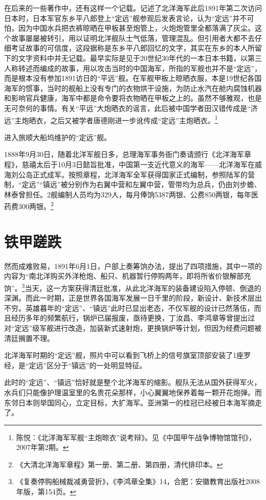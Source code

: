 \documentclass[12pt,UTF8]{ctexbook}
\begin{document}
在后来的一些著作中，还有这样一个记载。记述了北洋海军此后1891年第二次访问日本时，日本军官东乡平八郎登上“定远”舰参观后发表言论，认为“定远”并不可怕，因为中国水兵把衣裤晾晒在甲板甚至炮管上，火炮炮管里全都落满了灰尘。这个故事屡屡被转引，用以证明北洋舰队士气低落，管理混乱。但引用者大都不去仔细考证故事的可信度，这段据称是东乡平八郎回忆的文字，其实在东乡的本人所留下的文字资料中并无记载。最早实际是见于20世纪30年代的一本日本书籍，以第三人称转述而编成的故事，用以攻击当时的中国海军，所指的军舰也并不是“定远”，而是根本没有参加1891访日的“平远”舰。在军舰甲板上晾晒衣服，本是19世纪各国海军的惯事，当时的舰船上没有专门的衣物烘干设施，为防止水汽在舱内腐蚀机器和影响官兵健康，海军中都是命令要将衣物晒在甲板之上的。虽然不够雅观，也是无可奈何的事情。有关“平远”大炮晒衣的谣言，此后被中国学者田汉错传成是“济远”主炮晒衣，之后又被学者唐德刚进一步讹传成“定远”主炮晒衣。\footnote{陈悦：《北洋海军军舰“主炮晾衣”说考辩》。见《中国甲午战争博物馆馆刊》，2007年第2期。}

进入旅顺大船坞维护的“定远”舰。

1888年9月30日，随着北洋军舰日多，总理海军事务衙门奏请颁行《北洋海军章程》，慈禧太后于10月3日懿旨批准，中国第一支近代意义的海军——北洋海军在威海刘公岛正式成军。按照章程，北洋海军全军获得国家正式编制，参照陆军的营制，“定远”“镇远”被分别作为右翼中营和左翼中营，管带均为总兵，仍由刘步蟾、林泰曾担任。2舰编制人员均为329人，每月俸饷5387两银、公费850两银，每年医药费300两银。\footnote{《大清北洋海军章程》第一册、第二册、第四册，清代排印本。}

\section{铁甲蹉跌}

然而成难败易，1891年6月1日，户部上奏筹饷办法，提出了四项措施，其中一项的内容为“南北洋购买外洋枪炮、船只、机器暂行停购两年，即将所省价银解部充饷”。\footnote{《复奏停购船械裁减勇营折》，《李鸿章全集》14，合肥：安徽教育出版社2008年版，第154页。}当天，这一方案获得清廷批准，从此北洋海军的装备建设陷入停顿、倒退的深渊。而此一时期，正是世界各国海军发展一日千里的阶段，新设计、新技术层出不穷。英雄暮年的“定远”、“镇远”此时已显出老态，不仅军舰的设计已然落伍，而且经历多年的频繁航行，锅炉已届报废，亟待更换，丁汝昌、李鸿章等曾提出过对“定远”级军舰进行改造，加装新式速射炮，更换锅炉等计划，但因为经费问题被清廷搁置不理。

北洋海军时期的“定远”舰，照片中可以看到飞桥上的信号旗室顶部安装了1座罗经，是“定远”区分于“镇远”的一处明显特征。

此时的“定远”、“镇远”恰好就是整个北洋海军的缩影。舰队无法从国外获得军火，水兵们只能像护理温室里的名贵花朵那样，小心翼翼地保养着每一颗开花炮弹。而东邻日本则举国同心，立定目标，大扩海军。亚洲第一的桂冠已经被日本海军摘走了。
\end{document}

